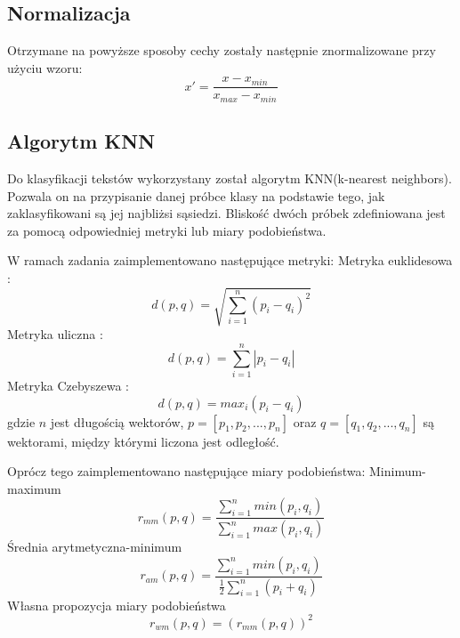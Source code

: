 \documentclass{classrep}
\begin{document}
\subsection{Normalizacja \cite{MLWiki}}
Otrzymane na powyższe sposoby cechy zostały następnie znormalizowane przy użyciu wzoru:
\begin{equation}
x' = \frac{x-x_{min}}{x_{max}-x_{min}} 
\end{equation}

\subsection{Algorytm KNN}
Do klasyfikacji tekstów wykorzystany został algorytm KNN(k-nearest neighbors). Pozwala on na przypisanie danej próbce klasy na podstawie tego, jak zaklasyfikowani są jej najbliżsi sąsiedzi. Bliskość dwóch próbek zdefiniowana jest za pomocą odpowiedniej metryki lub miary podobieństwa. \cite{KNNWiki}

W ramach zadania zaimplementowano następujące metryki: \newline
Metryka euklidesowa \cite{ANiewSkrypt}:
\begin{equation}
d(p,q) = \sqrt{\sum_{i=1}^{n} (p_{i} -q_{i})^{2}} 
\end{equation}
Metryka uliczna \cite{ANiewSkrypt}:
\begin{equation}
d(p,q) = \sum_{i=1}^{n} |p_{i} -q_{i}| 
\end{equation}
Metryka Czebyszewa \cite{ChebyshevWiki}:
\begin{equation}
d(p,q) = max_{i}(p_{i} -q_{i}) 
\end{equation}
gdzie \(n\) jest długością wektorów, \(p = [p_{1}, p_{2}, ..., p_{n}]\) oraz \(q = [q_{1}, q_{2}, ..., q_{n}]\) są wektorami, między którymi liczona jest odległość. 

Oprócz tego zaimplementowano następujące miary podobieństwa: \newline
Minimum-maximum \cite{ANiewSkrypt}
\begin{equation}
r_{mm}(p,q) = \frac{\sum_{i=1}^{n}min(p_{i},q_{i})}{\sum_{i=1}^{n}max(p_{i},q_{i})} 
\end{equation}
Średnia arytmetyczna-minimum \cite{ANiewSkrypt}
\begin{equation}
r_{am}(p,q) = \frac{\sum_{i=1}^{n}min(p_{i},q_{i})}{\frac{1}{2}\sum_{i=1}^{n}(p_{i}+q_{i})} 
\end{equation}
Własna propozycja miary podobieństwa
\begin{equation}
r_{wm}(p,q) = (r_{mm}(p,q))^{2}
\end{equation}
\end{document}
